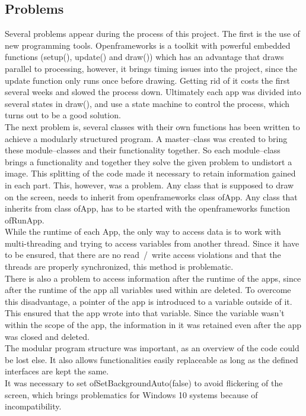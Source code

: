 \documentclass[journal,final,a4paper,twoside]{PS}
\begin{document}
\subsection{Problems}
\label{sec:probs}
Several problems appear during the process of this project.
The first is the use of new programming tools. Openframeworks is a toolkit with powerful embedded functions (setup(), update() and draw()) which has an advantage that draws parallel to processing, however, it brings timing issues into the project, since the update function only runs once before drawing. Getting rid of it costs the first several weeks and slowed the process down. Ultimately each app was divided into several states in draw(), and use a state machine to control the process, which turns out to be a good solution.  \\
The next problem is, several classes with their own functions has been written to achieve a modularly structured program. A  master--class was created to bring these module--classes and their functionality together. So each module--class brings a functionality and together they solve the given problem to undistort a image. This splitting of the code made it necessary to retain information gained in each part. This, however, was a problem. Any class that is supposed to draw on the screen, needs to inherit from openframeworks class ofApp. Any class that inherits from class ofApp, has to be started with the openframeworks function ofRunApp.\\
While the runtime of each App, the only way to access data is to work with multi-threading and trying to access variables from another thread. Since it have to be ensured, that there are no read~/~write access violations and that the threads are properly synchronized, this method is problematic. \\
There is also a problem to access information after the runtime of the apps, since after the runtime of the app all variables used within are deleted. To overcome this disadvantage, a pointer of the app is introduced to a variable outside of it. This ensured that the app wrote into that variable. Since the variable wasn't within the scope of the app, the information in it was retained even after the app was closed and deleted.\\
The modular program structure was important, as an overview of the code could be lost else. It also allows functionalities easily replaceable as long as the defined interfaces are kept the same.
\\
It was necessary to set ofSetBackgroundAuto(false) to avoid flickering of the screen, which brings problematics for Windows 10 systems because of incompatibility. 
\end{document}
